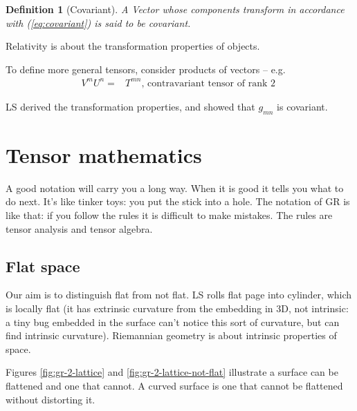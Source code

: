 \documentclass[]{article}
\newtheorem{defn}[thm]{Definition}
\begin{document}
\begin{defn}[Covariant]
	A Vector whose components transform in accordance with (\ref{eq:covariant}) is said to be \emph{covariant}.
\end{defn}
 
Relativity is about the transformation properties of objects.

To define more general tensors, consider products of vectors -- e.g.
\begin{align*}
	V^mU^n=&T^{mn} \text{, contravariant tensor of rank 2 }
\end{align*}

LS derived the transformation properties, and showed that $g_{mn}$ is covariant.


\section{Tensor mathematics}

A good notation will carry you a long way. When it is good it tells you what to do next. It's like tinker toys: you put the stick into a hole. The notation of GR is like that: if you follow the rules it is difficult to make mistakes. The rules are tensor analysis and tensor algebra.

\subsection{Flat space}

Our aim is to distinguish flat from not flat. LS rolls flat page into cylinder, which is locally flat (it has extrinsic curvature from the embedding in 3D, not intrinsic: a tiny bug embedded in the surface can't notice this sort of curvature, but can find intrinsic curvature). Riemannian geometry is about intrinsic properties of space.
 
Figures \ref{fig:gr-2-lattice} and \ref{fig:gr-2-lattice-not-flat} illustrate a surface can be flattened and one that cannot. A curved surface is one that cannot be flattened without distorting it.
\end{document}
